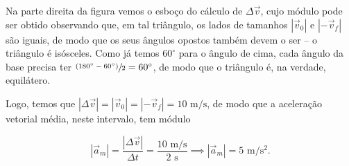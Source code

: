 \begin{exemplo}[Nível II]
\begin{enumerate}
Na parte direita da figura vemos o esboço do cálculo de $\Delta \vec{v}$, cujo módulo pode ser obtido observando que, em tal triângulo, os lados de tamanhos $|\vec{v}_0|$ e $|-\vec{v}_f|$ são iguais, de modo que os seus ângulos opostos também devem o ser -- o triângulo é isósceles. Como já temos $60^\circ$ para o ângulo de cima, cada ângulo da base precisa ter $\sfrac{(180^\circ-60^\circ)}{2}=60^\circ$, de modo que o triângulo é, na verdade, equilátero. 

Logo, temos que $|\Delta \vec{v}|=|\vec{v}_0|=|-\vec{v}_f|=10 \text{ m/s}$, de modo que a aceleração vetorial média, neste intervalo, tem módulo

$$ | \vec{a}_m|= \dfrac{|\Delta \vec{v}|}{\Delta t}= \dfrac{10 \text{ m/s}}{2\text{ s}} \implies \boxed{| \vec{a}_m|=5\text{ m/s$^2$}.}$$
     
     
    
\end{enumerate}

  
\end{exemplo}


\vspace{0.3cm}






